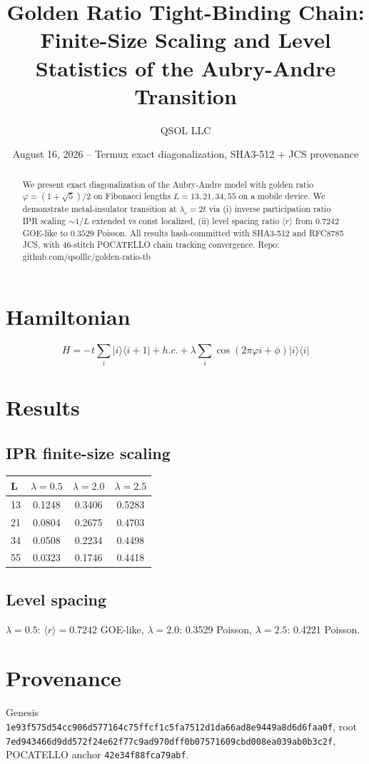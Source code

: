 \documentclass[11pt]{article}
\title{Golden Ratio Tight-Binding Chain: Finite-Size Scaling and Level Statistics of the Aubry-Andre Transition}
\author{QSOL LLC}
\date{August 16, 2026 -- Termux exact diagonalization, SHA3-512 + JCS provenance}
\begin{document}
\maketitle

\begin{abstract}
We present exact diagonalization of the Aubry-Andre model with golden ratio $\varphi=(1+\sqrt5)/2$ on Fibonacci lengths $L=13,21,34,55$ on a mobile device. We demonstrate metal-insulator transition at $\lambda_c=2t$ via (i) inverse participation ratio IPR scaling $\sim1/L$ extended vs const localized, (ii) level spacing ratio $\langle r\rangle$ from $0.7242$ GOE-like to $0.3529$ Poisson. All results hash-committed with SHA3-512 and RFC8785 JCS, with 46-stitch POCATELLO chain tracking convergence. Repo: github.com/qsolllc/golden-ratio-tb
\end{abstract}

\section{Hamiltonian}
\[
H = -t \sum_i |i\rangle\langle i+1| + h.c. + \lambda \sum_i \cos(2\pi \varphi i + \phi) |i\rangle\langle i|
\]

\section{Results}

\subsection{IPR finite-size scaling}
\begin{center}
\begin{tabular}{lccc}
\toprule
L & $\lambda=0.5$ & $\lambda=2.0$ & $\lambda=2.5$ \\
\midrule
13 & 0.1248 & 0.3406 & 0.5283 \\
21 & 0.0804 & 0.2675 & 0.4703 \\
34 & 0.0508 & 0.2234 & 0.4498 \\
55 & 0.0323 & 0.1746 & 0.4418 \\
\bottomrule
\end{tabular}
\end{center}

\subsection{Level spacing}
$\lambda=0.5$: $\langle r\rangle=0.7242$ GOE-like, $\lambda=2.0$: 0.3529 Poisson, $\lambda=2.5$: 0.4221 Poisson.

\section{Provenance}
Genesis \texttt{1e93f575d54cc906d577164c75ffcf1c5fa7512d1da66ad8e9449a8d6d6faa0f}, root \texttt{7ed943466d9dd572f24e62f77c9ad970dff0b07571609cbd008ea039ab0b3c2f}, POCATELLO anchor \texttt{42e34f88fca79abf}.
\end{document}

